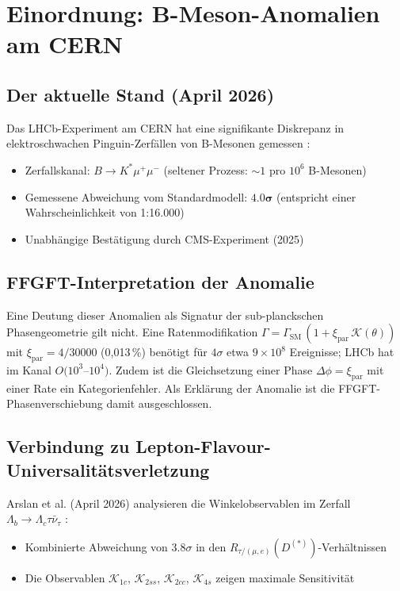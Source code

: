 	\section{Einordnung: B-Meson-Anomalien am CERN}
	
	\subsection{Der aktuelle Stand (April 2026)}
	
	Das LHCb-Experiment am CERN hat eine signifikante Diskrepanz in elektroschwachen Pinguin-Zerfällen von B-Mesonen gemessen \cite{CERN2026a, CERN2026b}:
	
	\begin{itemize}
		\item Zerfallskanal: $B \to K^* \mu^+\mu^-$ (seltener Prozess: $\sim 1$ pro $10^6$ B-Mesonen)
		\item Gemessene Abweichung vom Standardmodell: $\mathbf{4.0\sigma}$ (entspricht einer Wahrscheinlichkeit von 1:16.000)
		\item Unabhängige Bestätigung durch CMS-Experiment (2025)
	\end{itemize}
	
	\subsection{FFGFT-Interpretation der Anomalie}
	
	Eine Deutung dieser Anomalien als Signatur der sub-planckschen Phasengeometrie gilt nicht. Eine Ratenmodifikation $\Gamma = \Gamma_{\text{SM}}\,(1 + \xi_{\text{par}}\,\mathcal{K}(\theta))$ mit $\xi_{\text{par}} = 4/30000$ (0,013\,\%) benötigt für $4\sigma$ etwa $9\times10^8$ Ereignisse; LHCb hat im Kanal $O(10^3$--$10^4)$. Zudem ist die Gleichsetzung einer Phase $\Delta\phi = \xi_{\text{par}}$ mit einer Rate ein Kategorienfehler. Als Erklärung der Anomalie ist die FFGFT-Phasenverschiebung damit ausgeschlossen.
	
	\subsection{Verbindung zu Lepton-Flavour-Universalitätsverletzung}
	
	Arslan et al. (April 2026) analysieren die Winkelobservablen im Zerfall $\Lambda_b \to \Lambda_c \tau \bar{\nu}_\tau$ \cite{Arslan2026}:
	
	\begin{itemize}
		\item Kombinierte Abweichung von $3.8\sigma$ in den $R_{\tau/(\mu,e)}(D^{(*)})$-Verhältnissen
		\item Die Observablen $\mathcal{K}_{1c}$, $\mathcal{K}_{2ss}$, $\mathcal{K}_{2cc}$, $\mathcal{K}_{4s}$ zeigen maximale Sensitivität
	\end{itemize}
	
